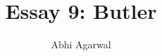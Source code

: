 \documentclass[11pt, oneside]{article}
\title{Essay 9: Butler}
\author{Abhi Agarwal}
\date{}
\begin{document}
\maketitle

\par 
\end{document}
